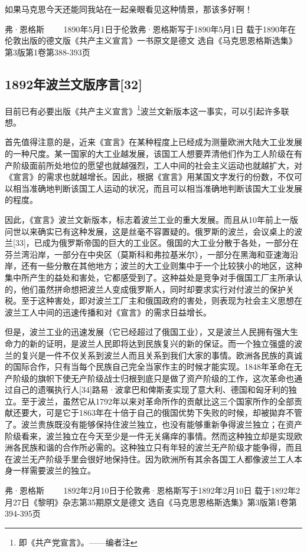 \documentclass[UTF8,zihao=-4,a4paper]{ctexart}
\begin{document}
如果马克思今天还能同我站在一起亲眼看见这种情景，那该多好啊！\par
弗·恩格斯 
 　　1890年5月1日于伦敦弗·恩格斯写于1890年5月1日 
 载于1890年在伦敦出版的德文版《共产主义宣言》一书原文是德文 
 选自《马克思恩格斯选集》第3版第1卷第388-393页\par
\subsection*{1892年波兰文版序言[32]}
目前已有必要出版《共产主义宣言》\footnote{即《共产党宣言》。——编者注}波兰文新版本这一事实，可以引起许多联想。\par
首先值得注意的是，近来《宣言》在某种程度上已经成为测量欧洲大陆大工业发展的一种尺度。某一国家的大工业越发展，该国工人想要弄清他们作为工人阶级在有产阶级面前所处地位的愿望也就越强烈，工人中间的社会主义运动也就越扩大，对《宣言》的需求也就越增长。因此，根据《宣言》用某国文字发行的份数，不仅可以相当准确地判断该国工人运动的状况，而且可以相当准确地判断该国大工业发展的程度。\par
因此，《宣言》波兰文新版本，标志着波兰工业的重大发展。而且从10年前上一版问世以来确实已有这种发展，这是丝毫不容置疑的。俄罗斯的波兰，会议桌上的波兰[33]，已成为俄罗斯帝国的巨大的工业区。俄国的大工业分散于各处，一部分在芬兰湾沿岸，一部分在中央区（莫斯科和弗拉基米尔），一部分在黑海和亚速海沿岸，还有一些分散在其他地方；波兰的大工业则集中于一个比较狭小的地区，这种集中所产生的益处和害处，它都感受到了。这种益处是竞争对手俄国工厂主所承认的，他们虽然拼命想把波兰人变成俄罗斯人，同时却要求实行对付波兰的保护关税。至于这种害处，即对波兰工厂主和俄国政府的害处，则表现为社会主义思想在波兰工人中间的迅速传播和对《宣言》的需求日益增长。\par
但是，波兰工业的迅速发展（它已经超过了俄国工业），又是波兰人民拥有强大生命力的新的证明，是波兰人民即将达到民族复兴的新的保证。而一个独立强盛的波兰的复兴是一件不仅关系到波兰人而且关系到我们大家的事情。欧洲各民族的真诚的国际合作，只有当每个民族自己完全当家作主的时候才能实现。1848年革命在无产阶级的旗帜下使无产阶级战士归根到底只是做了资产阶级的工作，这次革命也通过自己的遗嘱执行人[34]路易·波拿巴和俾斯麦实现了意大利、德国和匈牙利的独立。至于波兰，虽然它从1792年以来对革命所作的贡献比这三个国家所作的全部贡献还要大，可是它于1863年在十倍于自己的俄国优势下失败的时候，却被拋弃不管了。波兰贵族既没有能够保持住波兰独立，也没有能够重新争得波兰独立；在资产阶级看来，波兰独立在今天至少是一件无关痛痒的事情。然而这种独立却是实现欧洲各民族和谐的合作所必需的。这种独立只有年轻的波兰无产阶级才能争得，而且在波兰无产阶级手里会很好地保持住。因为欧洲所有其余各国工人都像波兰工人本身一样需要波兰的独立。\par
弗·恩格斯 
 　　1892年2月10日于伦敦弗·恩格斯写于1892年2月10日 
 载于1892年2月27日《黎明》杂志第35期原文是德文 
 选自《马克思恩格斯选集》第3版第1卷第394-395页\par
\end{document}
